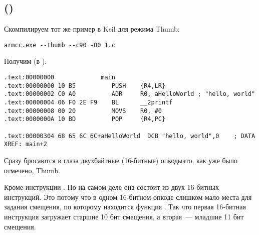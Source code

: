 \subsection{\NonOptimizingKeilVI (\ThumbMode)}

Скомпилируем тот же пример в Keil для режима Thumb:

\begin{lstlisting}
armcc.exe --thumb --c90 -O0 1.c 
\end{lstlisting}

Получим (в \IDA):

\begin{lstlisting}[caption=\NonOptimizingKeilVI (\ThumbMode) + \IDA]
.text:00000000             main
.text:00000000 10 B5          PUSH    {R4,LR}
.text:00000002 C0 A0          ADR     R0, aHelloWorld ; "hello, world"
.text:00000004 06 F0 2E F9    BL      __2printf
.text:00000008 00 20          MOVS    R0, #0
.text:0000000A 10 BD          POP     {R4,PC}

.text:00000304 68 65 6C 6C+aHelloWorld  DCB "hello, world",0    ; DATA XREF: main+2
\end{lstlisting}

Сразу бросаются в глаза двухбайтные (16-битные) опкоды\EMDASH{}это, как уже было отмечено, Thumb.

Кроме инструкции .
Но на самом деле она состоит из двух 16-битных инструкций.
Это потому что в одном 16-битном опкоде слишком мало места для задания смещения, по которому находится функция \printf.
Так что первая 16-битная инструкция загружает старшие 10 бит смещения, а вторая~--- младшие 11 бит смещения.


